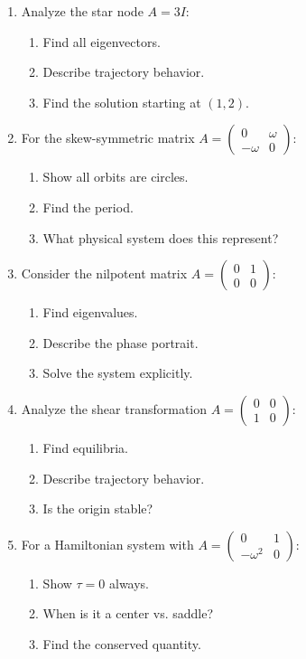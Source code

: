 \documentclass[12pt]{article}
\begin{document}
\begin{enumerate}[resume]
\item Analyze the star node $A = 3I$:
\begin{enumerate}[label=(\alph*)]
    \item Find all eigenvectors.
    \item Describe trajectory behavior.
    \item Find the solution starting at $(1, 2)$.
\end{enumerate}

\item For the skew-symmetric matrix $A = \begin{pmatrix} 0 & \omega \\ -\omega & 0 \end{pmatrix}$:
\begin{enumerate}[label=(\alph*)]
    \item Show all orbits are circles.
    \item Find the period.
    \item What physical system does this represent?
\end{enumerate}

\item Consider the nilpotent matrix $A = \begin{pmatrix} 0 & 1 \\ 0 & 0 \end{pmatrix}$:
\begin{enumerate}[label=(\alph*)]
    \item Find eigenvalues.
    \item Describe the phase portrait.
    \item Solve the system explicitly.
\end{enumerate}

\item Analyze the shear transformation $A = \begin{pmatrix} 0 & 0 \\ 1 & 0 \end{pmatrix}$:
\begin{enumerate}[label=(\alph*)]
    \item Find equilibria.
    \item Describe trajectory behavior.
    \item Is the origin stable?
\end{enumerate}

\item For a Hamiltonian system with $A = \begin{pmatrix} 0 & 1 \\ -\omega^{2} & 0 \end{pmatrix}$:
\begin{enumerate}[label=(\alph*)]
    \item Show $\tau = 0$ always.
    \item When is it a center vs. saddle?
    \item Find the conserved quantity.
\end{enumerate}
\end{enumerate}
\end{document}
